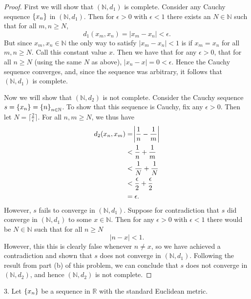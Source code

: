 \documentclass{article}
\newcommand{\N}{\mathbb{N}}
\newcommand{\R}{\mathbb{R}}
\begin{document}
\begin{proof}

First we will show that $(\N, d_1)$ is complete. Consider any Cauchy
sequence $\cbr{x_n}$ in $(\N, d_1)$. Then for $\epsilon > 0$ with
$\epsilon < 1$ there exists an $N \in \N$ such that for all $m, n \geq
N$,
%
\begin{equation*}
    d_1(x_m, x_n) = |x_m - x_n| < \epsilon
    .
\end{equation*}
%
But since $x_m, x_n \in \N$ the only way to satisfy $|x_m - x_n| < 1$ is
if $x_m = x_n$ for all $m, n \geq N$. Call this constant value $x$. Then
we have that for any $\epsilon > 0$, that for all $n \geq N$ (using the
same $N$ as above), $|x_n - x| = 0 < \epsilon$. Hence the Cauchy
sequence converges, and, since the sequence was arbitrary, it follows
that $(\N, d_1)$ is complete.

Now we will show that $(\N, d_2)$ is not complete. Consider the Cauchy
sequence $s = \cbr{x_n} = \cbr{n}_{n \in \N}$. To show that this
sequence is Cauchy, fix any $\epsilon > 0$. Then let $N = \lceil
\frac{2}{\epsilon} \rceil$. For all $n, m \geq N$, we thus have
%
\begin{align*}
    d_2(x_n, x_m)
        &= \envert{ \frac{1}{n} - \frac{1}{m} } \\
        &< \frac{1}{n} + \frac{1}{m} \\
        &< \frac{1}{N} + \frac{1}{N} \\
        &< \frac{\epsilon}{2} + \frac{\epsilon}{2} \\
        &= \epsilon
        .
\end{align*}
%
However, $s$ fails to converge in $(\N, d_1)$. Suppose for contradiction
that $s$ did converge in $(\N, d_1)$ to some $x \in \N$. Then for any
$\epsilon > 0$ with $\epsilon < 1$ there would be $N \in \N$ such that
for all $n \geq N$
%
\begin{equation*}
    |n - x| < 1
    .
\end{equation*}
%
However, this this is clearly false whenever $n \neq x$, so we have
achieved a contradiction and shown that $s$ does not converge in $(\N,
d_1)$. Following the result from part (b) of this problem, we can
conclude that $s$ does not converge in $(\N, d_2)$, and hence $(\N,
d_2)$ is not complete.

\end{proof}

\newpage

3. Let $\cbr{x_n}$ be a sequence in $\R$ with the standard Euclidean metric.
\end{document}
